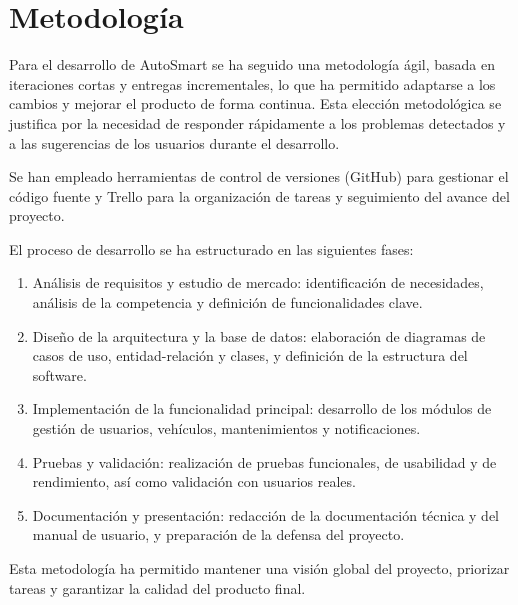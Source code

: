\chapter{Metodología}

Para el desarrollo de AutoSmart se ha seguido una metodología ágil, basada en iteraciones cortas y entregas incrementales, lo que ha permitido adaptarse a los cambios y mejorar el producto de forma continua. Esta elección metodológica se justifica por la necesidad de responder rápidamente a los problemas detectados y a las sugerencias de los usuarios durante el desarrollo.

Se han empleado herramientas de control de versiones (GitHub) para gestionar el código fuente y Trello para la organización de tareas y seguimiento del avance del proyecto.

El proceso de desarrollo se ha estructurado en las siguientes fases:
\begin{enumerate}
    \item Análisis de requisitos y estudio de mercado: identificación de necesidades, análisis de la competencia y definición de funcionalidades clave.
    \item Diseño de la arquitectura y la base de datos: elaboración de diagramas de casos de uso, entidad-relación y clases, y definición de la estructura del software.
    \item Implementación de la funcionalidad principal: desarrollo de los módulos de gestión de usuarios, vehículos, mantenimientos y notificaciones.
    \item Pruebas y validación: realización de pruebas funcionales, de usabilidad y de rendimiento, así como validación con usuarios reales.
    \item Documentación y presentación: redacción de la documentación técnica y del manual de usuario, y preparación de la defensa del proyecto.
\end{enumerate}

Esta metodología ha permitido mantener una visión global del proyecto, priorizar tareas y garantizar la calidad del producto final. 